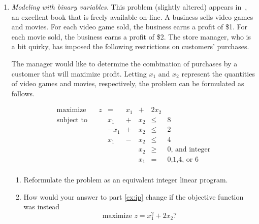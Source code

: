 \begin{enumerate}
\begin{solution}
\end{solution}

\item \emph{Modeling with binary variables.} This problem (slightly
  altered) appears in~\cite{bradley:1977}, an excellent book that is
  freely available on-line. A business sells video games and
  movies. For each video game sold, the business earns a profit of
  \$1. For each movie sold, the business earns a profit of \$2. The
  store manager, who is a bit quirky, has imposed the following
  restrictions on customers' purchases.


The manager would like to determine the combination of purchases by a
customer that will maximize profit. Letting $x_1$ and $x_2$ represent
the quantities of video games and movies, respectively, the problem
can be formulated as follows.

\[
\begin{array}{lrrrrrrl}
\textrm{maximize} &   & z & = & x_1 & + & 2x_2 & \\
\textrm{subject to} & & & x_1 & + & x_2 & \leq & 8 \\
& & & -x_1 & + & x_2 & \leq & 2 \\
& & & x_1 & - & x_2 & \leq & 4 \\
& & & & & x_2 & \geq & \text{0, and integer} \\
& & & & & x_1 & = & \text{0,1,4, or 6} \\
\end{array}
\]

\begin{enumerate}
\item Reformulate the problem as an equivalent integer linear
  program.\label{ex:ip}
\item How would your answer to part \ref{ex:ip} change if the
  objective function was instead
\[ \text{maximize~} z = x_1^2 + 2x_2\text{?} \] \label{ex:quad}
\end{enumerate}


\end{enumerate}
